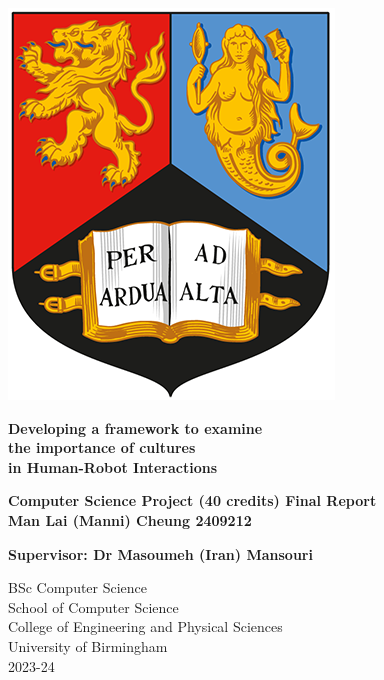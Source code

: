 
\thispagestyle{empty}

\begin{spacing}{2}
	\begin{center}
		\includegraphics[scale = 1.5]{Preamble/BirmCrest.png}
	\end{center}
	\vspace{10mm}
	\begin{center}
		\textbf{\Large Developing a framework to examine}\\
		\textbf{\Large the importance of cultures}\\
		\textbf{\Large in Human-Robot Interactions}
		\vspace{10mm}
	\end{center}
	\begin{center}
		\textbf{\large Computer Science Project (40 credits) Final Report}
		\vspace{10mm}
		\\\textbf{\Large Man Lai (Manni) Cheung 2409212}
		\vspace{20mm}
	\end{center}
	\begin{center}
		\textbf{\large Supervisor: Dr Masoumeh (Iran) Mansouri}
		\vspace{5mm}
	\end{center}	
	\begin{center}
		{\large BSc Computer Science}
		\\ {\large School of Computer Science}
		\\ {\large College of Engineering and Physical Sciences}
		\\ {\large University of Birmingham}
		\\ {\large 2023-24}
	\end{center}
\end{spacing}



